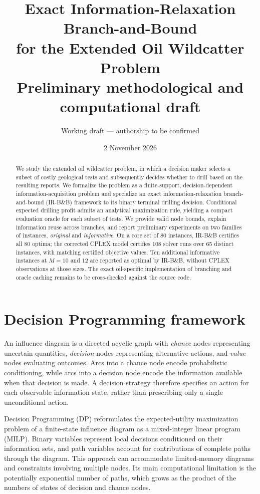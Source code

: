 \documentclass[11pt,a4paper]{article}
\title{\textbf{Exact Information-Relaxation Branch-and-Bound\\for the Extended Oil Wildcatter Problem}\\[5pt]
\large Preliminary methodological and computational draft}
\author{Working draft --- authorship to be confirmed}
\date{2 November 2026}
\begin{document}
\maketitle
\vspace{-1em}
\begin{abstract}
We study the extended oil wildcatter problem, in which a decision maker selects a subset of costly geological tests and subsequently decides whether to drill based on the resulting reports. We formalize the problem as a finite-support, decision-dependent information-acquisition problem and specialize an exact information-relaxation branch-and-bound (IR-B\&B) framework to its binary terminal drilling decision. Conditional expected drilling profit admits an analytical maximization rule, yielding a compact evaluation oracle for each subset of tests. We provide valid node bounds, explain information reuse across branches, and report preliminary experiments on two families of instances, \emph{original} and \emph{informative}. On a core set of 80 instances, IR-B\&B certifies all 80 optima; the corrected CPLEX model certifies 108 solver runs over 65 distinct instances, with matching certified objective values. Ten additional informative instances at $M=10$ and $12$ are reported as optimal by IR-B\&B, without CPLEX observations at those sizes. The exact oil-specific implementation of branching and oracle caching remains to be cross-checked against the source code.
\end{abstract}

\section{Decision Programming framework}\label{sec:dp}
An influence diagram is a directed acyclic graph with \emph{chance} nodes representing uncertain quantities, \emph{decision} nodes representing alternative actions, and \emph{value} nodes evaluating outcomes. Arcs into a chance node encode probabilistic conditioning, while arcs into a decision node encode the information available when that decision is made. A decision strategy therefore specifies an action for each observable information state, rather than prescribing only a single unconditional action.

Decision Programming (DP) \cite{Salo2022} reformulates the expected-utility maximization problem of a finite-state influence diagram as a mixed-integer linear program (MILP). Binary variables represent local decisions conditioned on their information sets, and path variables account for contributions of complete paths through the diagram. This approach can accommodate limited-memory diagrams and constraints involving multiple nodes. Its main computational limitation is the potentially exponential number of paths, which grows as the product of the numbers of states of decision and chance nodes.
\end{document}
